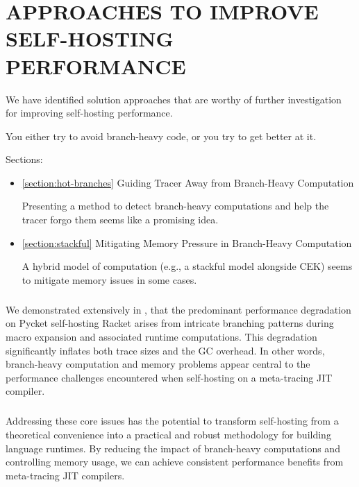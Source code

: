\chapter[\texorpdfstring{APPROACHES TO IMPROVE SELF-HOSTING PERFORMANCE}
                          {7. Improving Performance}]{APPROACHES TO IMPROVE SELF-HOSTING PERFORMANCE}

	\label{chapter:solution}

  \begin{chaptersynopsis}\footnotesize
    \footnotesize

    We have identified solution approaches that are worthy of further investigation for improving self-hosting performance.

    You either try to avoid branch-heavy code, or you try to get better at it.

    Sections:
		\begin{itemize}
			\item \ref{section:hot-branches} Guiding Tracer Away from Branch-Heavy Computation

				Presenting a method to detect branch-heavy computations and help the tracer forgo them seems like a promising idea.
			\item \ref{section:stackful} Mitigating Memory Pressure in Branch-Heavy Computation

				A hybrid model of computation (e.g., a stackful model alongside CEK) seems to mitigate memory issues in some cases.
		\end{itemize}
  \end{chaptersynopsis}

  \paragraph{}%
    We demonstrated extensively in , that the predominant performance degradation on Pycket self-hosting Racket arises from intricate branching patterns during macro expansion and associated runtime computations. This degradation significantly inflates both trace sizes and the GC overhead. In other words, branch-heavy computation and memory problems appear central to the performance challenges encountered when self-hosting on a meta-tracing JIT compiler.

  \paragraph{}%
    Addressing these core issues has the potential to transform self-hosting from a theoretical convenience into a practical and robust methodology for building language runtimes. By reducing the impact of branch-heavy computations and controlling memory usage, we can achieve consistent performance benefits from meta-tracing JIT compilers.

